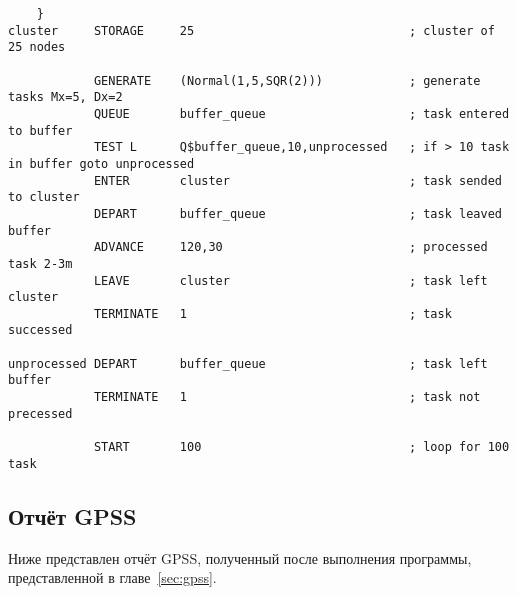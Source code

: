 \documentclass[12pt,a4paper,oneside]{extarticle}
\begin{document}
        \begin{lstlisting}
    }
cluster     STORAGE     25                              ; cluster of 25 nodes
            
            GENERATE    (Normal(1,5,SQR(2)))            ; generate tasks Mx=5, Dx=2
            QUEUE       buffer_queue                    ; task entered to buffer
            TEST L      Q$buffer_queue,10,unprocessed   ; if > 10 task in buffer goto unprocessed
            ENTER       cluster                         ; task sended to cluster
            DEPART      buffer_queue                    ; task leaved buffer
            ADVANCE     120,30                          ; processed task 2-3m
            LEAVE       cluster                         ; task left cluster
            TERMINATE   1                               ; task successed

unprocessed DEPART      buffer_queue                    ; task left buffer
            TERMINATE   1                               ; task not precessed

            START       100                             ; loop for 100 task
        \end{lstlisting}

    \subsection{Отчёт GPSS}
    \label{sec:report}
        Ниже представлен отчёт GPSS, полученный после выполнения программы, представленной в главе~\ref{sec:gpss}.
\end{document}
